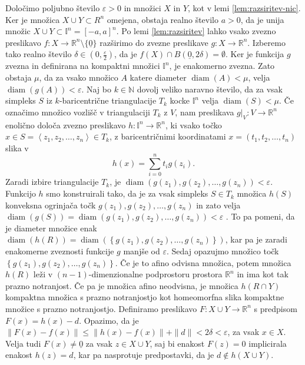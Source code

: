 \documentclass[mat1]{fmfdelo}
\newcommand{\R}{\mathbb R}
\newcommand{\N}{\mathbb N}
\DeclareMathOperator{\diam}{diam}
\newcommand{\I}{\mathbb I}
\newcommand{\0}{\underline{0}}
\begin{document}
\begin{dokaz}
Določimo poljubno število $\varepsilon > 0$ in množici $X$ in $Y$, kot v lemi \ref{lem:razsiritev-nic}. Ker je množica $X \cup Y \subset R^n$ omejena, obstaja realno število $a > 0$, da je unija množic $X \cup Y \subset \I^n = \left [ -a, a \right ]^n$. Po lemi \ref{lem:razsiritev} lahko vsako zvezno preslikavo $f : X \to \R^n \setminus \{ \0 \}$ razširimo do zvezne preslikave $g : X \to \R^n$. Izberemo tako realno število $\delta \in (0, \frac{\varepsilon}{2})$, da je $f(X) \cap B( \0, 2\delta) = \emptyset$. Ker je funkcija $g$ zvezna in definirana na kompaktni množici $\I^n$, je enakomerno zvezna. Zato obstaja $\mu$, da za vsako množico $A$ katere diameter $\diam(A) < \mu$, velja $\diam(g(A)) < \varepsilon$. Naj bo $k \in \N$ dovolj veliko naravno število, da za vsak simpleks $S$ iz $k$-baricentrične triangulacije $T_k$ kocke $\I^n$ velja $\diam(S) < \mu$. Če označimo množico vozlišč v triangulaciji $T_k$ z $V$, nam preslikava $g|_V : V \to \R^n$ enolično določa zvezno preslikavo $h : \I^n \to \R^n$, ki vsako točko $x \in S = \left < z_1, z_2, \dots, z_n \right > \in T_k$, z baricentričnimi koordinatami $x = (t_1, t_2, \dots, t_n)$ slika v 
$$h(x) = \sum_{i=0}^n t_i g(z_i).$$
Zaradi izbire triangulacije $T_k$, je $\diam(g(z_1), g(z_2), \dots, g(z_n)) < \varepsilon$. Funkcijo $h$ smo konstruirali tako, da je za vsak simpleks $S \in T_k$ množica $h(S)$ konveksna ogrinjača točk $g(z_1), g(z_2), \dots, g(z_n)$ in zato velja $\diam(g(S)) = \diam(g(z_1), g(z_2), \dots, g(z_n)) < \varepsilon$ . To pa pomeni, da je diameter množice enak $\diam(h(R)) = \diam(\left \{ g(z_1), g(z_2), \dots, g(z_n) \right \})$, kar pa je zaradi enakomerne zveznosti funkcije $g$ manjše od $\varepsilon$.
Sedaj opazujmo množico točk $\left \{ g(z_1), g(z_2), \dots, g(z_n) \right \}$. Če je to afino odvisna množica, potem množica $h(R)$ leži v $(n-1)$-dimenzionalne podprostoru prostora $\R^n$ in ima kot tak prazno notranjost. Če pa je množica afino neodvisna, je množica $h(R \cap Y)$ kompaktna množica s prazno notranjostjo kot homeomorfna slika kompaktne množice s prazno notranjostjo.
Definiramo preslikavo $F : X \cup Y \to \R^n$ s predpisom $F(x)  = h(x) - d$. Opazimo, da je $\| F(x) - f(x) \| \leq \| h(x) - f(x) \| + \| d \| < 2\delta < \varepsilon$, za vsak $x \in X$. Velja tudi $F(x) \neq \0$ za vsak $z \in X \cup Y$, saj bi enakost $F(z) = 0$ implicirala enakost $h(z) = d$, kar pa nasprotuje predpostavki, da je $d \notin h(X \cup Y)$.
\end{dokaz}
\end{document}
